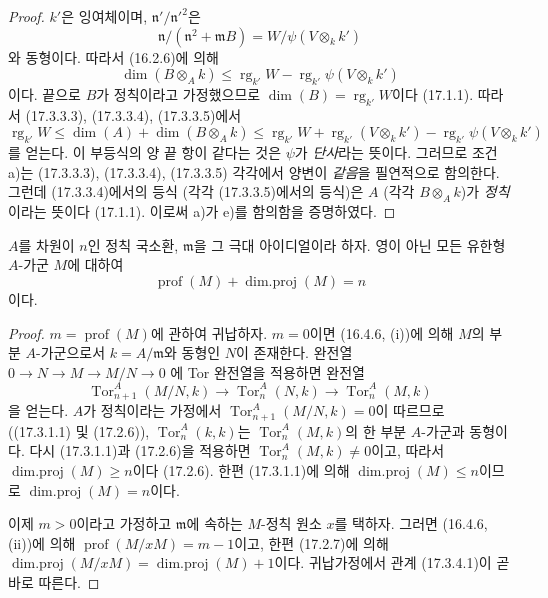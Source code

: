 \begin{proof}
$k'$은 잉여체이며, $\mathfrak{n}'/\mathfrak{n}'^2$은
\[
  \mathfrak{n}/(\mathfrak{n}^2+\mathfrak{m}B)
  =W/\psi(V\otimes_k k')
\]
와 동형이다. 따라서 (16.2.6)에 의해
\begin{equation}
\label{0.17.3.3.5-fr}
\tag{17.3.3.5}
  \dim(B\otimes_A k)
  \leq\operatorname{rg}_{k'}W
  -\operatorname{rg}_{k'}\psi(V\otimes_k k')
\end{equation}
이다. 끝으로 $B$가 정칙이라고 가정했으므로
$\dim(B)=\operatorname{rg}_{k'}W$이다 (17.1.1). 따라서
(17.3.3.3), (17.3.3.4), (17.3.3.5)에서
\[
  \operatorname{rg}_{k'}W
  \leq\dim(A)+\dim(B\otimes_A k)
  \leq\operatorname{rg}_{k'}W
  +\operatorname{rg}_{k'}(V\otimes_k k')
  -\operatorname{rg}_{k'}\psi(V\otimes_k k')
\]
를 얻는다. 이 부등식의 양 끝 항이 같다는 것은 $\psi$가
\emph{단사}라는 뜻이다. 그러므로 조건 a)는 (17.3.3.3),
(17.3.3.4), (17.3.3.5) 각각에서 양변이 \emph{같음}을 필연적으로
함의한다. 그런데 (17.3.3.4)에서의 등식 (각각 (17.3.3.5)에서의
등식)은 $A$ (각각 $B\otimes_A k$)가 \emph{정칙}이라는 뜻이다
(17.1.1). 이로써 a)가 e)를 함의함을 증명하였다.
\end{proof}

\begin{proposition}[17.3.4]
\label{0.17.3.4-fr}
$A$를 차원이 $n$인 정칙 국소환, $\mathfrak{m}$을 그 극대 아이디얼이라
하자. 영이 아닌 모든 유한형 $A$-가군 $M$에 대하여
\begin{equation}
\label{0.17.3.4.1-fr}
\tag{17.3.4.1}
  \operatorname{prof}(M)+\operatorname{dim.proj}(M)=n
\end{equation}
이다.
\end{proposition}

\begin{proof}
$m=\operatorname{prof}(M)$에 관하여 귀납하자. $m=0$이면 (16.4.6,
(i))에 의해 $M$의 부분 $A$-가군으로서 $k=A/\mathfrak{m}$와 동형인
$N$이 존재한다. 완전열
$0\longrightarrow N\longrightarrow M\longrightarrow M/N\longrightarrow0$
에 Tor 완전열을 적용하면 완전열
\[
  \operatorname{Tor}^A_{n+1}(M/N,k)\longrightarrow
  \operatorname{Tor}^A_n(N,k)\longrightarrow
  \operatorname{Tor}^A_n(M,k)
\]
을 얻는다. $A$가 정칙이라는 가정에서
$\operatorname{Tor}^A_{n+1}(M/N,k)=0$이 따르므로 ((17.3.1.1) 및
(17.2.6)), $\operatorname{Tor}^A_n(k,k)$는
$\operatorname{Tor}^A_n(M,k)$의 한 부분 $A$-가군과 동형이다. 다시
(17.3.1.1)과 (17.2.6)을 적용하면
$\operatorname{Tor}^A_n(M,k)\neq0$이고, 따라서
$\operatorname{dim.proj}(M)\geq n$이다 (17.2.6). 한편 (17.3.1.1)에
의해 $\operatorname{dim.proj}(M)\leq n$이므로
$\operatorname{dim.proj}(M)=n$이다.

이제 $m>0$이라고 가정하고 $\mathfrak{m}$에 속하는 $M$-정칙 원소
$x$를 택하자. 그러면 (16.4.6, (ii))에 의해
$\operatorname{prof}(M/xM)=m-1$이고, 한편 (17.2.7)에 의해
$\operatorname{dim.proj}(M/xM)=\operatorname{dim.proj}(M)+1$이다.
귀납가정에서 관계 (17.3.4.1)이 곧바로 따른다.
\end{proof}

